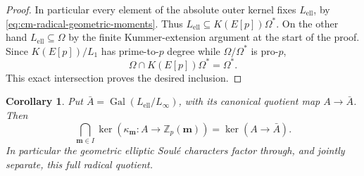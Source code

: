 \documentclass[11pt]{article}
\newtheorem{corollary}[theorem]{Corollary}
\theoremstyle{definition}\newtheorem{definition}[theorem]{Definition}
\begin{document}
\begin{proof}
In particular every element of the absolute outer kernel fixes
\(L_{\mathrm{ell}}\), by
\eqref{eq:cm-radical-geometric-moments}.
Thus \(L_{\mathrm{ell}}\subseteq K(E[p])\Omega^*\).
On the other hand \(L_{\mathrm{ell}}\subseteq\Omega\) by the
finite Kummer-extension argument at the start of the proof.
Since \(K(E[p])/L_1\) has prime-to-\(p\) degree while
\(\Omega/\Omega^*\) is pro-\(p\),
\[
                 \Omega\cap K(E[p])\Omega^*=\Omega^*.
\]
This exact intersection proves the desired inclusion.
\end{proof}

\begin{corollary}\label{cor:cm-radical-joint-kernel}
Put \(\bar A=\operatorname{Gal}(L_{\mathrm{ell}}/L_\infty)\),
with its canonical quotient map \(A\to\bar A\).
Then
\[
 \bigcap_{\boldsymbol m\in I}\ker
       (\kappa_{\boldsymbol m}:A\longrightarrow
                           \mathbb Z_p(\boldsymbol m))
                         =\ker(A\longrightarrow\bar A).
\]
In particular the geometric elliptic Soul\'e characters factor
through, and jointly separate, this full radical quotient.
\end{corollary}
\end{document}
